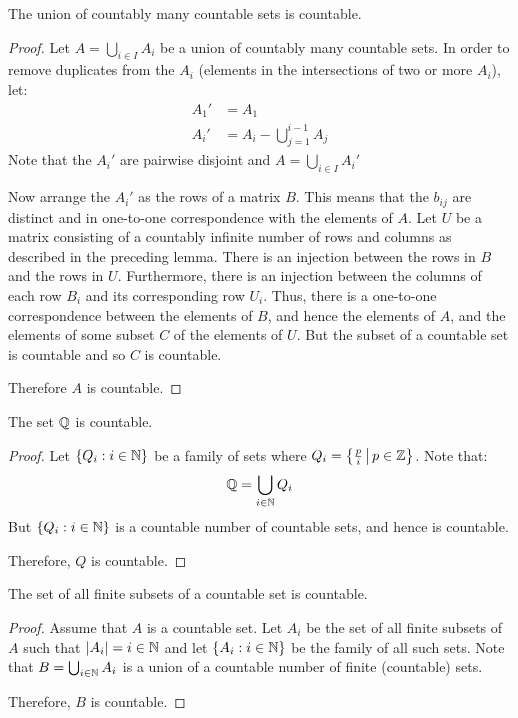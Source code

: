 \documentclass[letterpaper,12pt,fleqn]{article}
\begin{document}
\begin{theorem}
  The union of countably many countable sets is countable.
\end{theorem}

\begin{proof}
  Let \(A=\bigcup_{i\in I}A_i\) be a union of countably many countable sets.  In order to remove duplicates from the
  \(A_i\) (elements in the intersections of two or more \(A_i\)), let:
  \begin{align*}
    A_1' &= A_1 \\
    A_i' &= A_i-\bigcup_{j=1}^{i-1}A_j
  \end{align*}
  Note that the \(A_i'\) are pairwise disjoint and \(A=\bigcup_{i\in I}A_i'\)

  Now arrange the \(A_i'\) as the rows of a matrix \(B\).  This means that the \(b_{ij}\) are distinct and in
  one-to-one correspondence with the elements of \(A\).  Let \(U\) be a matrix consisting of a countably infinite
  number of rows and columns as described in the preceding lemma.  There is an injection between the rows in \(B\)
  and the rows in \(U\).  Furthermore, there is an injection between the columns of each row \(B_i\) and its
  corresponding row \(U_i\).  Thus, there is a one-to-one correspondence between the elements of \(B\), and hence
  the elements of \(A\), and the elements of some subset \(C\) of the elements of \(U\).  But the subset of a
  countable set is countable and so \(C\) is countable.

  Therefore \(A\) is countable.
\end{proof}

\begin{theorem}
  The set \(\mathbb{Q}\) is countable.
\end{theorem}

\begin{proof}
  Let \(\{Q_i:i\in\mathbb{N}\}\) be a family of sets where \(Q_i=\left\{{\frac{p}{i}}\,\middle|\,{p\in\mathbb{Z}}\right\}\).  Note that:
  \[\mathbb{Q}=\bigcup_{i\in\mathbb{N}}Q_i\]
  But \(\{Q_i:i\in\mathbb{N}\}\) is a countable number of countable sets, and hence is countable.

  Therefore, \(Q\) is countable.
\end{proof}

\begin{theorem}
  The set of all finite subsets of a countable set is countable.
\end{theorem}

\begin{proof}
  Assume that \(A\) is a countable set.  Let \(A_i\) be the set of all finite subsets of \(A\) such that
  \(\lvert A_i\rvert=i\in\mathbb{N}\) and let \(\{A_i:i\in\mathbb{N}\}\) be the family of all such sets.  Note that
  \(B=\bigcup_{i\in\mathbb{N}}A_i\) is a union of a countable number of finite (countable) sets.

  Therefore, \(B\) is countable.
\end{proof}
\end{document}

